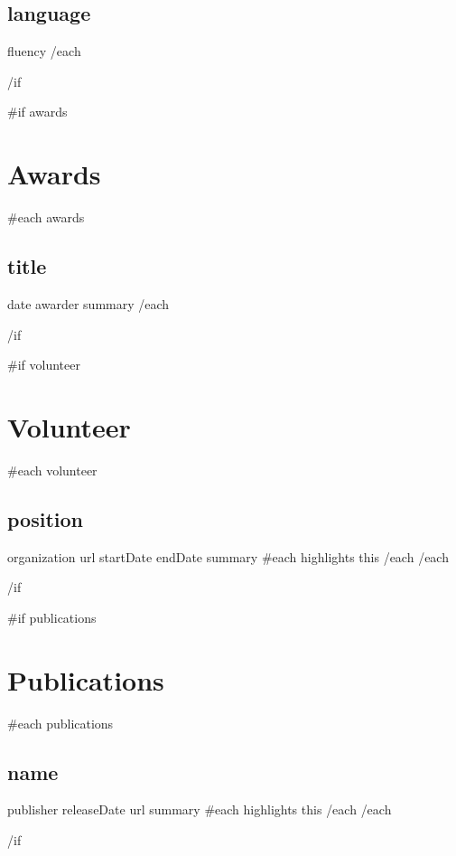 \documentclass[letterpaper]{article}
\begin{document}
\begin{paracol}{2}
\begin{leftcolumn*}
{    \subsection*{ {{ language }} } {
      {{ fluency }}\newline
    }
    {{/each}}
  }
  {{/if}}

  {{#if awards}}
  \section*{Awards} {
    {{#each awards}}
    \subsection*{ {{ title }} } {
      {{ date }}\newline
      {{ awarder }}\newline
      {{ summary }}\newline
    }
    {{/each}}
  }
  {{/if}}

  {{#if volunteer}}
  \section*{Volunteer} {
    {{#each volunteer}}
    \subsection*{ {{ position }} } {
      {{ organization }}\newline
      {{ url }}\newline
      {{ startDate }}\newline
      {{ endDate }}\newline
      {{ summary }}\newline
    }
    {{#each highlights}}
      {{ this }} 
    {{/each}}\newline
    {{/each}}
  }
  {{/if}}

  {{#if publications}}
  \section*{Publications} {
    {{#each publications}}
    \subsection*{ {{ name }} } {
      {{ publisher }}\newline
      {{ releaseDate }}\newline
      {{ url }}\newline
      {{ summary }}\newline
    }
    {{#each highlights}}
      {{ this }} 
    {{/each}}\newline
    {{/each}}
  }
  {{/if}}


\end{leftcolumn*}
\end{paracol}
\end{document}
